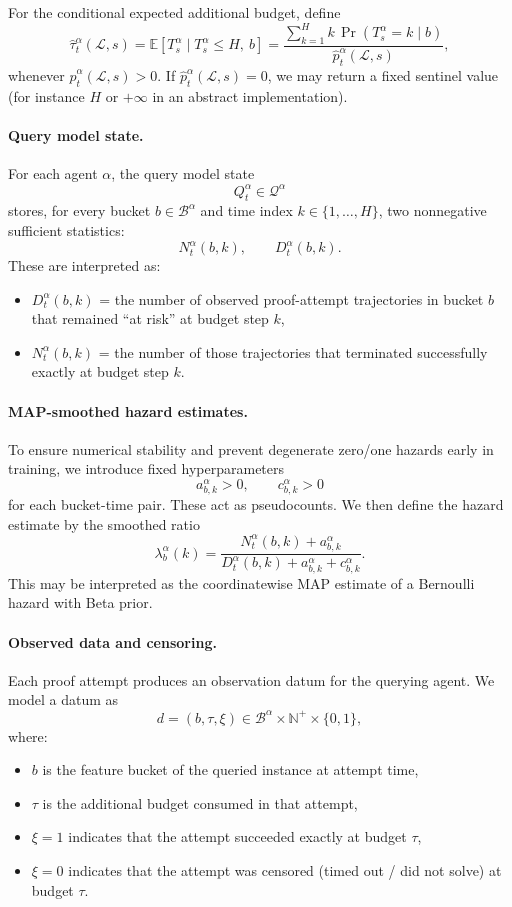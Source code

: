 For the conditional expected additional budget, define
\[
\hat\tau^\alpha_t(\mathcal L,s)
=
\mathbb E[T^\alpha_s \mid T^\alpha_s \le H,\ b]
=
\frac{\sum_{k=1}^{H} k\,\Pr(T^\alpha_s = k \mid b)}
{\hat p^\alpha_t(\mathcal L,s)},
\]
whenever $\hat p^\alpha_t(\mathcal L,s)>0$. If $\hat p^\alpha_t(\mathcal L,s)=0$, we may return a fixed sentinel value (for instance $H$ or $+\infty$ in an abstract implementation).

\paragraph{Query model state.}
For each agent $\alpha$, the query model state
\[
Q^\alpha_t \in \mathcal Q^\alpha
\]
stores, for every bucket $b\in\mathcal B^\alpha$ and time index $k\in\{1,\dots,H\}$, two nonnegative sufficient statistics:
\[
N^\alpha_{t}(b,k),\qquad D^\alpha_{t}(b,k).
\]
These are interpreted as:
\begin{itemize}
    \item $D^\alpha_t(b,k)$ = the number of observed proof-attempt trajectories in bucket $b$ that remained ``at risk'' at budget step $k$,
    \item $N^\alpha_t(b,k)$ = the number of those trajectories that terminated successfully exactly at budget step $k$.
\end{itemize}

\paragraph{MAP-smoothed hazard estimates.}
To ensure numerical stability and prevent degenerate zero/one hazards early in training, we introduce fixed hyperparameters
\[
a^\alpha_{b,k}>0,\qquad c^\alpha_{b,k}>0
\]
for each bucket-time pair. These act as pseudocounts. We then define the hazard estimate by the smoothed ratio
\[
\lambda^\alpha_b(k)
=
\frac{N^\alpha_t(b,k)+a^\alpha_{b,k}}
{D^\alpha_t(b,k)+a^\alpha_{b,k}+c^\alpha_{b,k}}.
\]
This may be interpreted as the coordinatewise MAP estimate of a Bernoulli hazard with Beta prior.

\paragraph{Observed data and censoring.}
Each proof attempt produces an observation datum for the querying agent. We model a datum as
\[
d=(b,\tau,\xi)\in \mathcal B^\alpha \times \mathbb N^+ \times \{0,1\},
\]
where:
\begin{itemize}
    \item $b$ is the feature bucket of the queried instance at attempt time,
    \item $\tau$ is the additional budget consumed in that attempt,
    \item $\xi=1$ indicates that the attempt succeeded exactly at budget $\tau$,
    \item $\xi=0$ indicates that the attempt was censored (timed out / did not solve) at budget $\tau$.
\end{itemize}

